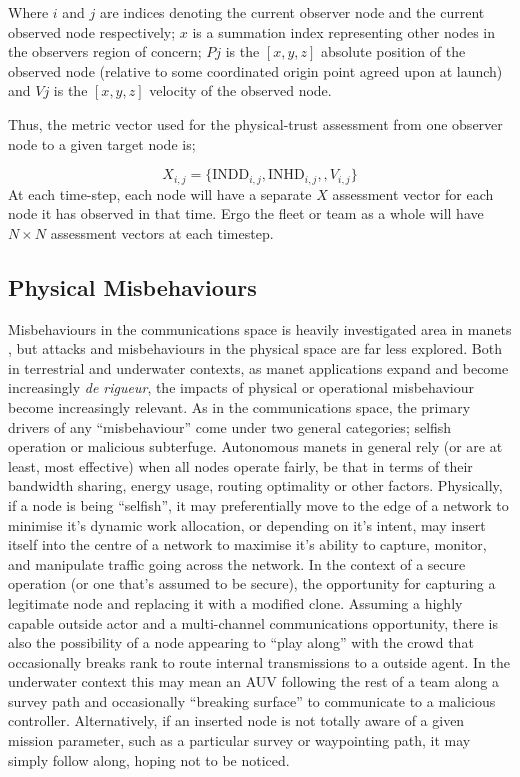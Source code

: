 Where $i$ and $j$ are indices denoting the current observer node and the current observed node respectively; $x$ is a summation index representing other nodes in the observers region of concern; $P{j}$ is the $[x,y,z]$ absolute position of the observed node (relative to some coordinated origin point agreed upon at launch) and $V{j}$ is the $[x,y,z]$ velocity of the observed node.

Thus, the metric vector used for the physical-trust assessment from one observer node to a given target node is;

\begin{equation}
  X_{i,j}=\{\text{INDD}_{i,j}, \text{INHD}_{i,j},, V_{i,j}\}
  \label{eq:phys_vector}
\end{equation}
At each time-step, each node will have a separate $X$ assessment vector for each node it has observed in that time. 
Ergo the fleet or team as a whole will have $N\times N$ assessment vectors at each timestep.

\subsection{Physical Misbehaviours}

Misbehaviours in the communications space is heavily investigated area in \glspl{manet} \cite{Konate2011,Wang2009,Chen2014a,Mitchell2014}, but attacks and misbehaviours in the physical space are far less explored. 
Both in terrestrial and underwater contexts, as \gls{manet} applications expand and become increasingly \emph{de rigueur}, the impacts of physical or operational misbehaviour become increasingly relevant. 
As in the communications space, the primary drivers of any ``misbehaviour'' come under two general categories; selfish operation or malicious subterfuge.
Autonomous \glspl{manet} in general rely (or are at least, most effective) when all nodes operate fairly, be that in terms of their bandwidth sharing, energy usage, routing optimality or other factors. 
Physically, if a node is being ``selfish'', it may preferentially move to the edge of a network to minimise it's dynamic work allocation, or depending on it's intent, may insert itself into the centre of a network to maximise it's ability to capture, monitor, and manipulate traffic going across the network. 
In the context of a secure operation (or one that's assumed to be secure), the opportunity for capturing a legitimate node and replacing it with a modified clone.
Assuming a highly capable outside actor and a multi-channel communications opportunity, there is also the possibility of a node appearing to ``play along'' with the crowd that occasionally breaks rank to route internal transmissions to a outside agent.
In the underwater context this may mean an AUV following the rest of a team along a survey path and occasionally ``breaking surface'' to communicate to a malicious controller.
Alternatively, if an inserted node is not totally aware of a given mission parameter, such as a particular survey or waypointing path, it may simply follow along, hoping not to be noticed.

